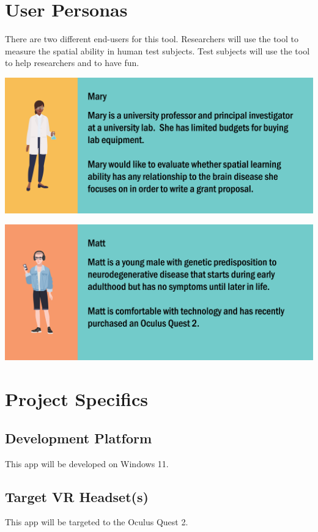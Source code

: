 \documentclass{report}
\begin{document}
\chapter*{User Personas}

There are two different end-users for this tool. Researchers will use the tool to measure the spatial ability in human test subjects. Test subjects will use the tool to help researchers and to have fun.

\vspace{10mm}

\includegraphics[width=1\textwidth]{Mary_with_story}

\vspace{10mm}

\includegraphics[width=1\textwidth]{Matt_with_story}

\chapter*{Project Specifics}
\section*{Development Platform}
This app will be developed on Windows 11.

\section*{Target VR Headset(s)}
This app will be targeted to the Oculus Quest 2.
\end{document}
